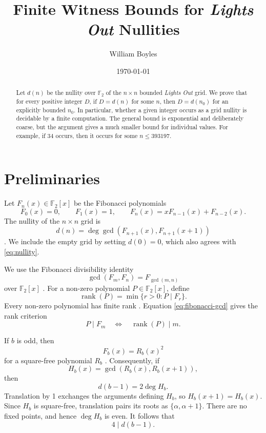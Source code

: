 \documentclass[a4paper]{article}
\newcommand{\F}{\mathbb{F}}
\DeclareMathOperator{\rank}{rank}
\begin{document}
\title{Finite Witness Bounds for \textit{Lights Out} Nullities}
\author{William Boyles}
\date{\today}
\maketitle

\begin{abstract}
	Let $d(n)$ be the nullity over $\F_2$ of the $n\times n$ bounded
	\textit{Lights Out} grid.
	We prove that for every positive integer $D$, if $D=d(n)$ for some
	$n$, then $D=d(n_0)$ for an explicitly bounded $n_0$.
	In particular, whether a given integer occurs as a grid nullity is
	decidable by a finite computation.
	The general bound is exponential and deliberately coarse, but the
	argument gives a much smaller bound for individual values.
	For example, if 34 occurs, then it occurs for some $n\leq393197$.
\end{abstract}

\section{Preliminaries}

Let $F_n(x)\in\F_2[x]$ be the Fibonacci polynomials
\[
	F_0(x)=0,\qquad F_1(x)=1,\qquad
	F_n(x)=xF_{n-1}(x)+F_{n-2}(x).
\]
The nullity of the $n\times n$ grid is
\begin{equation}\label{eq:nullity}
	d(n)=
	\deg\gcd\!\left(F_{n+1}(x),F_{n+1}(x+1)\right)
\end{equation}
\cite{Sutner00sigma-automataand}.
We include the empty grid by setting $d(0)=0$, which also agrees with
\eqref{eq:nullity}.

We use the Fibonacci divisibility identity
\begin{equation}\label{eq:fibonacci-gcd}
	\gcd(F_m,F_n)=F_{\gcd(m,n)}
\end{equation}
over $\F_2[x]$ \cite{HUNZIKER2004465}.
For a non-zero polynomial $P\in\F_2[x]$, define
\[
	\rank(P)=\min\{r>0:P\mid F_r\}.
\]
Every non-zero polynomial has finite rank \cite{HUNZIKER2004465}.
Equation \eqref{eq:fibonacci-gcd} gives the rank criterion
\begin{equation}\label{eq:rank-criterion}
	P\mid F_m
	\quad\Longleftrightarrow\quad
	\rank(P)\mid m.
\end{equation}

If $b$ is odd, then
\begin{equation}\label{eq:square-free-root}
	F_b(x)=R_b(x)^2
\end{equation}
for a square-free polynomial $R_b$ \cite{HUNZIKER2004465}.
Consequently, if
\[
	H_b(x)=\gcd(R_b(x),R_b(x+1)),
\]
then
\begin{equation}\label{eq:base-nullity}
	d(b-1)=2\deg H_b.
\end{equation}
Translation by 1 exchanges the arguments defining $H_b$, so
$H_b(x+1)=H_b(x)$.
Since $H_b$ is square-free, translation pairs its roots as
$\{\alpha,\alpha+1\}$.
There are no fixed points, and hence $\deg H_b$ is even.
It follows that
\begin{equation}\label{eq:even-base-divisibility}
	4\mid d(b-1).
\end{equation}
\end{document}
